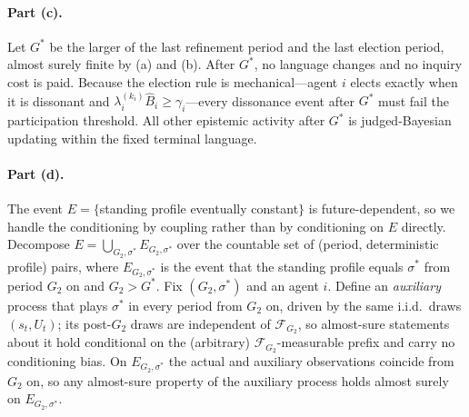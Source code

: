 \documentclass[11pt]{article}
\theoremstyle{definition}
\begin{document}
\paragraph{Part (c).}
Let $G^{*}$ be the larger of the last refinement period and the last election period, almost surely finite by (a) and (b).
After $G^{*}$, no language changes and no inquiry cost is paid.
Because the election rule is mechanical---agent $i$ elects exactly when it is dissonant and $\lambda_i^{(k_i)}\widehat B_i\geq\gamma_i$---every dissonance event after $G^{*}$ must fail the participation threshold.
All other epistemic activity after $G^{*}$ is judged-Bayesian updating within the fixed terminal language.

\paragraph{Part (d).}
The event $E=\{$standing profile eventually constant$\}$ is future-dependent, so we handle the conditioning by coupling rather than by conditioning on $E$ directly.
Decompose $E=\bigcup_{G_2,\sigma^{*}}E_{G_2,\sigma^{*}}$ over the countable set of (period, deterministic profile) pairs, where $E_{G_2,\sigma^{*}}$ is the event that the standing profile equals $\sigma^{*}$ from period $G_2$ on and $G_2>G^{*}$.
Fix $(G_2,\sigma^{*})$ and an agent $i$.
Define an \emph{auxiliary} process that plays $\sigma^{*}$ in every period from $G_2$ on, driven by the same i.i.d.\ draws $(s_t,U_t)$; its post-$G_2$ draws are independent of $\mathcal F_{G_2}$, so almost-sure statements about it hold conditional on the (arbitrary) $\mathcal F_{G_2}$-measurable prefix and carry no conditioning bias.
On $E_{G_2,\sigma^{*}}$ the actual and auxiliary observations coincide from $G_2$ on, so any almost-sure property of the auxiliary process holds almost surely on $E_{G_2,\sigma^{*}}$.
\end{document}

